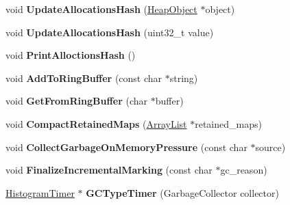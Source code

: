 \begin{DoxyCompactItemize}
\item 
void {\bfseries Update\+Allocations\+Hash} (\hyperlink{classv8_1_1internal_1_1_heap_object}{Heap\+Object} $\ast$object)\hypertarget{classv8_1_1internal_1_1_heap_a1fb1446df0afd2c1025314d52baae455}{}\label{classv8_1_1internal_1_1_heap_a1fb1446df0afd2c1025314d52baae455}

\item 
void {\bfseries Update\+Allocations\+Hash} (uint32\+\_\+t value)\hypertarget{classv8_1_1internal_1_1_heap_aa93f769571f434f17f36209ecc26beb1}{}\label{classv8_1_1internal_1_1_heap_aa93f769571f434f17f36209ecc26beb1}

\item 
void {\bfseries Print\+Alloctions\+Hash} ()\hypertarget{classv8_1_1internal_1_1_heap_ae8ced048d099bf41915121505acbc1ee}{}\label{classv8_1_1internal_1_1_heap_ae8ced048d099bf41915121505acbc1ee}

\item 
void {\bfseries Add\+To\+Ring\+Buffer} (const char $\ast$string)\hypertarget{classv8_1_1internal_1_1_heap_abb466e94ea452743fc5ce4aa5c0f661d}{}\label{classv8_1_1internal_1_1_heap_abb466e94ea452743fc5ce4aa5c0f661d}

\item 
void {\bfseries Get\+From\+Ring\+Buffer} (char $\ast$buffer)\hypertarget{classv8_1_1internal_1_1_heap_a67dc1edeee5b0178364a3620e1f369d2}{}\label{classv8_1_1internal_1_1_heap_a67dc1edeee5b0178364a3620e1f369d2}

\item 
void {\bfseries Compact\+Retained\+Maps} (\hyperlink{classv8_1_1internal_1_1_array_list}{Array\+List} $\ast$retained\+\_\+maps)\hypertarget{classv8_1_1internal_1_1_heap_aa21be784a0f1ff1ab5e97f5ec28f04fc}{}\label{classv8_1_1internal_1_1_heap_aa21be784a0f1ff1ab5e97f5ec28f04fc}

\item 
void {\bfseries Collect\+Garbage\+On\+Memory\+Pressure} (const char $\ast$source)\hypertarget{classv8_1_1internal_1_1_heap_ad165718c03b511d79c43cfba96b7810a}{}\label{classv8_1_1internal_1_1_heap_ad165718c03b511d79c43cfba96b7810a}

\item 
void {\bfseries Finalize\+Incremental\+Marking} (const char $\ast$gc\+\_\+reason)\hypertarget{classv8_1_1internal_1_1_heap_a4e2b0c612cf2d89a8e976fd22f1acdff}{}\label{classv8_1_1internal_1_1_heap_a4e2b0c612cf2d89a8e976fd22f1acdff}

\item 
\hyperlink{classv8_1_1internal_1_1_histogram_timer}{Histogram\+Timer} $\ast$ {\bfseries G\+C\+Type\+Timer} (Garbage\+Collector collector)\hypertarget{classv8_1_1internal_1_1_heap_a2e9880be5b43938a2112647e48275e8f}{}\label{classv8_1_1internal_1_1_heap_a2e9880be5b43938a2112647e48275e8f}


\end{DoxyCompactItemize}
